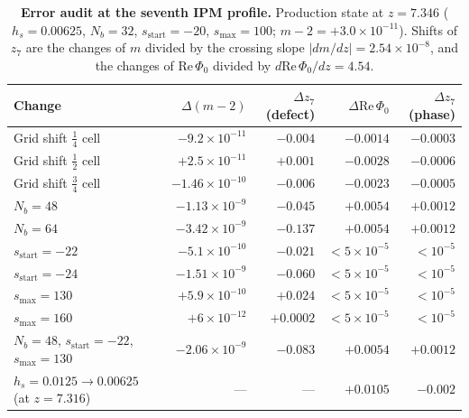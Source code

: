 \documentclass[11pt]{article}
\newcommand{\ReP}{\mathrm{Re}\,\Phi_0}
\newcommand{\sstart}{s_{\mathrm{start}}}
\newcommand{\smax}{s_{\max}}
\begin{document}
\begin{table}[h]
\centering
\caption{\textbf{Error audit at the seventh IPM profile.} Production state at $z=7.346$ ($h_s=0.00625$, $N_b=32$,
$\sstart=-20$, $\smax=100$; $m-2=+3.0\times10^{-11}$). Shifts of $z_7$ are the changes of $m$ divided by the crossing
slope $|dm/dz|=2.54\times10^{-8}$, and the changes of $\ReP$ divided by $d\ReP/dz=4.54$.}
\small
\setlength{\tabcolsep}{5pt}
\begin{tabular}{lrrrr}
\toprule
Change & $\Delta(m-2)$ & $\Delta z_7$ (defect) & $\Delta\ReP$ & $\Delta z_7$ (phase)\\
\midrule
Grid shift $\tfrac14$ cell & $-9.2\times10^{-11}$ & $-0.004$ & $-0.0014$ & $-0.0003$\\
Grid shift $\tfrac12$ cell & $+2.5\times10^{-11}$ & $+0.001$ & $-0.0028$ & $-0.0006$\\
Grid shift $\tfrac34$ cell & $-1.46\times10^{-10}$ & $-0.006$ & $-0.0023$ & $-0.0005$\\
$N_b=48$ & $-1.13\times10^{-9}$ & $-0.045$ & $+0.0054$ & $+0.0012$\\
$N_b=64$ & $-3.42\times10^{-9}$ & $-0.137$ & $+0.0054$ & $+0.0012$\\
$\sstart=-22$ & $-5.1\times10^{-10}$ & $-0.021$ & $<5\times10^{-5}$ & $<10^{-5}$\\
$\sstart=-24$ & $-1.51\times10^{-9}$ & $-0.060$ & $<5\times10^{-5}$ & $<10^{-5}$\\
$\smax=130$ & $+5.9\times10^{-10}$ & $+0.024$ & $<5\times10^{-5}$ & $<10^{-5}$\\
$\smax=160$ & $+6\times10^{-12}$ & $+0.0002$ & $<5\times10^{-5}$ & $<10^{-5}$\\
$N_b=48$, $\sstart=-22$, $\smax=130$ & $-2.06\times10^{-9}$ & $-0.083$ & $+0.0054$ & $+0.0012$\\
$h_s=0.0125\to0.00625$ (at $z=7.316$) & --- & --- & $+0.0105$ & $-0.002$\\
\bottomrule
\end{tabular}
\label{tab:1}
\end{table}
\end{document}
